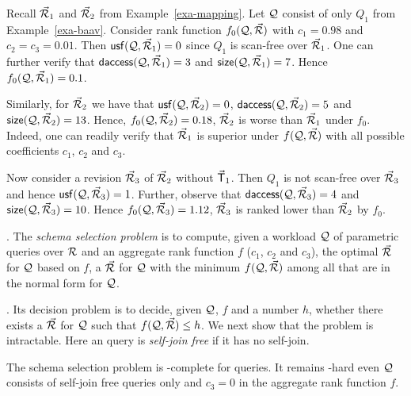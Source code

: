 \begin{example}\label{exa-measures}
Recall $\vec{{\mathcal R}}_{1}$ and $\vec{{\mathcal R}}_{2}$ from Example~\ref{exa-mapping}.
Let $\mathcal Q$ consist of only $Q_{1}$ from Example~\ref{exa-baav}.
Consider rank function $f_{0}(\mathcal Q, \vec{{\mathcal R}})$ with $c_{1} = 0.98$
and  $c_{2} = c_{3} = 0.01$.
%
Then ${\mathsf{usf}}(\mathcal Q, \allowbreak \vec{{\mathcal R}}_{1}) \allowbreak = \allowbreak 0$ since $Q_{1}$ is
scan-free over $\vec{{\mathcal R}}_{1}$.
One can further verify that
${\mathsf{daccess}}(\mathcal Q, \allowbreak \vec{{\mathcal R}}_{1}) \allowbreak = \allowbreak 3$ and
${\mathsf{size}}(\mathcal Q, \allowbreak \vec{{\mathcal R}}_{1}) \allowbreak = \allowbreak 7$.
Hence $f_{0}(\mathcal Q, \vec{{\mathcal R}}_{1}) = 0.1$.

\vspace{0.6ex}
Similarly, for $\vec{{\mathcal R}}_{2}$ we have that
${\mathsf{usf}}(\mathcal Q, \allowbreak \vec{{\mathcal R}}_{2})\allowbreak =\allowbreak 0$,
${\mathsf{daccess}}(\mathcal Q, \allowbreak \vec{{\mathcal R}}_{2}) \allowbreak = \allowbreak 5$ and
${\mathsf{size}}(\mathcal Q, \allowbreak \vec{{\mathcal R}}_{2}) \allowbreak = \allowbreak 13$.  Hence,
$f_{0}(\mathcal Q, \vec{{\mathcal R}}_{2}) = 0.18$, \ie $\vec{{\mathcal R}}_{2}$ is worse than
$\vec{{\mathcal R}}_{1}$ under $f_{0}$. Indeed, one can readily verify that
$\vec{{\mathcal R}}_{1}$ is superior under $f(\mathcal Q, \vec{{\mathcal R}})$ with all
possible coefficients $c_{1}$, $c_{2}$ and $c_{3}$.

\vspace{0.6ex}
Now consider a revision $\vec{{\mathcal R}}_{3}$ of $\vec{{\mathcal R}}_{2}$ without
$\vec{\protect\mathsf{T}}_{1}$. Then
$Q_{1}$ is not scan-free over $\vec{{\mathcal R}}_{3}$ and hence
${\mathsf{usf}}(\mathcal Q,\allowbreak \vec{{\mathcal R}}_{3}) = 1$. Further, observe that
${\mathsf{daccess}}(\mathcal Q, \allowbreak \vec{{\mathcal R}}_{3}) = 4$ and
${\mathsf{size}}(\mathcal Q, \allowbreak \vec{{\mathcal R}}_{3}) \allowbreak = \allowbreak 10$.
Hence $f_{0}(\mathcal Q,\allowbreak \vec{{\mathcal R}}_{3})\allowbreak =\allowbreak 1.12$,
\ie $\vec{{\mathcal R}}_{3}$ is ranked lower than $\vec{{\mathcal R}}_{2}$ by $f_{0}$.
\end{example}

\vspace{-0.4ex}




.
The {\em \baav schema selection problem} is to compute, given a
workload $\mathcal Q$ of parametric queries over ${\mathcal R}$ and an aggregate
rank function $f$ (\ie $c_{1}$, $c_{2}$ and $c_{3}$), the
optimal \bds $\vec{{\mathcal R}}$ for $\mathcal Q$ based on $f$, \ie a \bds
$\vec{{\mathcal R}}$ for $\mathcal Q$ with the minimum $f(\mathcal Q, \vec{{\mathcal R}})$ among all
\bdss that are in the normal form for $\mathcal Q$.


. Its  decision problem is to decide, given $\mathcal Q$, $f$ and a
number $h$, whether there exists a \bds $\vec{{\mathcal R}}$ for
$\mathcal Q$ such that $f(\mathcal Q, \vec{{\mathcal R}})\leq h$.
We next show that the problem is intractable.
  Here an \SPC query 
  is {\em self-join free} if it has no self-join.


\begin{theorem}\label{thm-complexity}
  The \baav schema selection problem
  is \NP-complete for \SQL %
  queries. 
It remains \NP-hard even $\mathcal Q$ consists of self-join free
\SPC queries only and $c_{3} = 0$ in
the aggregate rank function $f$.
\end{theorem}


